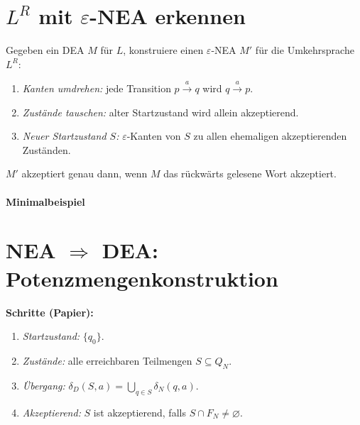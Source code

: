 \section{\texorpdfstring{$L^{R}$ mit $\varepsilon$-NEA erkennen}{LR mit ε-NEA erkennen}}
Gegeben ein DEA $M$ für $L$, konstruiere einen $\varepsilon$-NEA $M'$ für die Umkehrsprache $L^R$:
\begin{enumerate}
  \item \textit{Kanten umdrehen:} jede Transition $p\xrightarrow{a}q$ wird $q\xrightarrow{a}p$.
  \item \textit{Zustände tauschen:} alter Startzustand wird allein akzeptierend.
  \item \textit{Neuer Startzustand $S$:} $\varepsilon$-Kanten von $S$ zu allen ehemaligen akzeptierenden Zuständen.
\end{enumerate}
$M'$ akzeptiert genau dann, wenn $M$ das rückwärts gelesene Wort akzeptiert.

\paragraph{Minimalbeispiel}\leavevmode
\begin{center}
\qquad
{}
\end{center}

\section{\texorpdfstring{NEA $\Rightarrow$ DEA: Potenzmengenkonstruktion}{NEA → DEA: Potenzmengenkonstruktion}}
\textbf{Schritte (Papier):}
\begin{enumerate}
  \item \textit{Startzustand:} $\{q_0\}$.
  \item \textit{Zustände:} alle erreichbaren Teilmengen $S\subseteq Q_N$.
  \item \textit{Übergang:} $\delta_D(S,a)=\bigcup_{q\in S} \delta_N(q,a)$.
  \item \textit{Akzeptierend:} $S$ ist akzeptierend, falls $S\cap F_N\neq\varnothing$.
\end{enumerate}

